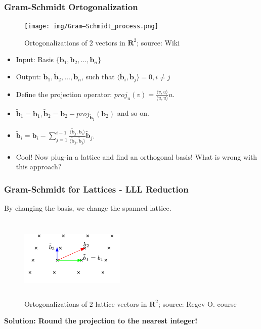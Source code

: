 \documentclass{beamer}
\begin{document}
\begin{frame}
    \frametitle{Gram-Schmidt Ortogonalization}
        \begin{figure}
            \texttt{[image: img/Gram–Schmidt\_process.png]}
            \caption{Ortogonalizations of $2$ vectors in $\mathbf{R}^2$; source: Wiki}
        \end{figure}

    \begin{itemize}
        \item Input: Basis $\{ \mathbf{b}_1, \mathbf{b}_2, \dots , \mathbf{b}_n \} $
        \pause \item Output: $\tilde{\mathbf{b}}_1, \tilde{\mathbf{b}}_2, \dots, \tilde{\mathbf{b}}_n$, such that $ \langle \tilde{\mathbf{b}}_i, \tilde{\mathbf{b}}_j \rangle = 0, i \neq j$ 
        \pause \item Define the projection operator: $proj_{u}(v) = \frac{\langle v, u \rangle}{\langle u, u \rangle}u$.
        \pause \item $\tilde{\mathbf{b}}_1 = \mathbf{b}_1, \tilde{\mathbf{b}}_2 = \mathbf{b}_2 - proj_{\tilde{\mathbf{b}}_1}({\mathbf{b}}_2)$ and so on.
        \pause \item $\tilde{\mathbf{b}}_i = \mathbf{b}_i - \sum_{j=1}^{i-1}{\frac{\langle \tilde{\mathbf{b}}_j, \mathbf{b}_i \rangle}{\langle \tilde{\mathbf{b}}_j, \tilde{\mathbf{b}}_j \rangle} \tilde{\mathbf{b}}_j}$.
        \pause \item Cool! Now plug-in a lattice and find an orthogonal basis! What is wrong with this approach?
    \end{itemize}
\end{frame}

\begin{frame}
    \frametitle{Gram-Schmidt for Lattices - LLL Reduction}
    By changing the basis, we change the spanned lattice.
    \begin{figure}
            \includegraphics[width=5cm,height=4cm,keepaspectratio]{img/gram-schmidt.png}
            \caption{Ortogonalizations of $2$ lattice vectors in $\mathbf{R}^2$; source: Regev O. course}
        \end{figure}

    \textbf{Solution: Round the projection to the nearest integer!}
\end{frame}
\end{document}
